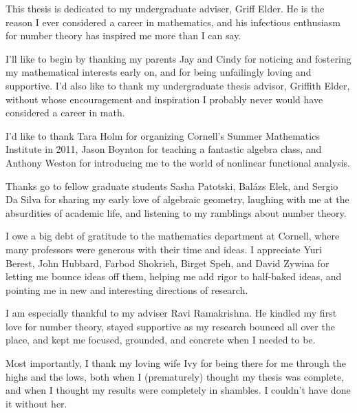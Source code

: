 \documentclass[phd,cornellheadings,tocprelim]{cornell}
\begin{document}
\begin{dedication}
This thesis is dedicated to my undergraduate adviser, Griff Elder. He is the 
reason I ever considered a career in mathematics, and his infectious enthusiasm 
for number theory has inspired me more than I can say. 
\end{dedication}

\begin{acknowledgements}
I'll like to begin by thanking my parents Jay and Cindy for noticing and 
fostering my mathematical interests early on, and for being unfailingly loving 
and supportive. I'd also like to thank my undergraduate thesis advisor, 
Griffith Elder, without whose encouragement and inspiration I probably never 
would have considered a career in math. 

I'd like to thank Tara Holm for organizing Cornell's Summer Mathematics 
Institute in 2011, Jason Boynton for teaching a fantastic algebra class, and 
Anthony Weston for introducing me to the world of nonlinear functional 
analysis. 

Thanks go to fellow graduate students Sasha Patotski, Bal\'azs Elek, and 
Sergio Da Silva for sharing my early love of algebraic geometry, laughing with 
me at the absurdities of academic life, and listening to my ramblings 
about number theory. 

I owe a big debt of gratitude to the mathematics department at Cornell, where 
many professors were generous with their time and ideas. I appreciate Yuri 
Berest, John Hubbard, Farbod Shokrieh, Birget Speh, and David Zywina for 
letting me bounce ideas off them, helping me add rigor to half-baked ideas, 
and pointing me in new and interesting directions of research. 

I am especially thankful to my adviser Ravi Ramakrishna. He kindled my first 
love for number theory, stayed supportive as my research bounced all over the 
place, and kept me focused, grounded, and concrete when I needed to be. 

Most importantly, I thank my loving wife Ivy for being there for me 
through the highs and the lows, both when I (prematurely) thought my thesis was 
complete, and when I thought my results were completely in shambles. I couldn't 
have done it without her. 
\end{acknowledgements}

\contentspage
\normalspacing
\setcounter{page}{1}
\pagestyle{cornell}
\addtolength{\parskip}{0.5\baselineskip}

















\printbibliography[heading=bibintoc]
\end{document}
